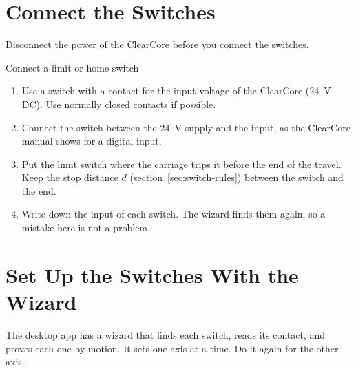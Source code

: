 \section{Connect the Switches}

\begin{caution}
Disconnect the power of the ClearCore before you connect the switches.
\end{caution}

\begin{procedure}{Connect a limit or home switch}
\begin{enumerate}
  \item Use a switch with a contact for the input voltage of the ClearCore
        (24~V DC). Use normally closed contacts if possible.
  \item Connect the switch between the 24~V supply and the input, as the
        ClearCore manual shows for a digital input.
  \item Put the limit switch where the carriage trips it before the end of the
        travel. Keep the stop distance $d$ (section~\ref{sec:switch-rules})
        between the switch and the end.
  \item Write down the input of each switch. The wizard finds them again, so
        a mistake here is not a problem.
\end{enumerate}
\end{procedure}

\section{Set Up the Switches With the Wizard}\label{sec:switch-wizard}

The desktop app has a wizard that finds each switch, reads its contact, and
proves each one by motion. It sets one axis at a time. Do it again for the
other axis.

